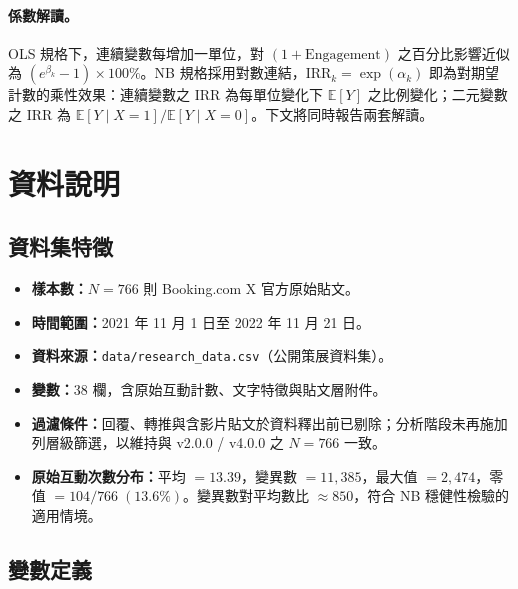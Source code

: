 \documentclass[12pt,a4paper]{ctexart}
\begin{document}
\paragraph{係數解讀。}OLS 規格下，連續變數每增加一單位，對 $(1+\text{Engagement})$ 之百分比影響近似為 $(e^{\beta_k}-1)\times 100\%$。NB 規格採用對數連結，$\text{IRR}_k=\exp(\alpha_k)$ 即為對期望計數的乘性效果：連續變數之 IRR 為每單位變化下 $\mathbb{E}[Y]$ 之比例變化；二元變數之 IRR 為 $\mathbb{E}[Y\mid X=1]/\mathbb{E}[Y\mid X=0]$。下文將同時報告兩套解讀。

\section{資料說明}

\subsection{資料集特徵}

\begin{itemize}
    \item \textbf{樣本數：}$N = 766$ 則 Booking.com X 官方原始貼文。
    \item \textbf{時間範圍：}2021 年 11 月 1 日至 2022 年 11 月 21 日。
    \item \textbf{資料來源：}\texttt{data/research\_data.csv}（公開策展資料集）。
    \item \textbf{變數：}38 欄，含原始互動計數、文字特徵與貼文層附件。
    \item \textbf{過濾條件：}回覆、轉推與含影片貼文於資料釋出前已剔除；分析階段未再施加列層級篩選，以維持與 v2.0.0 / v4.0.0 之 $N=766$ 一致。
    \item \textbf{原始互動次數分布：}平均 $=13.39$，變異數 $=11{,}385$，最大值 $=2{,}474$，零值 $=104/766\;(13.6\%)$。變異數對平均數比 $\approx 850$，符合 NB 穩健性檢驗的適用情境。
\end{itemize}

\subsection{變數定義}
\end{document}
